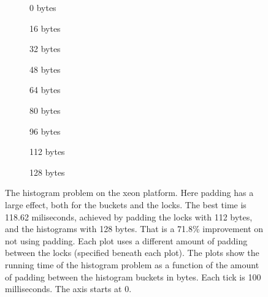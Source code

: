 \begin{figure}[hbpt]
	\graphicspath{{plots/}}
	\begin{subfigure}{0.32\textwidth}
		
		\caption{0 bytes}
	\end{subfigure}
	\begin{subfigure}{0.32\textwidth}
		
		\caption{16 bytes}
	\end{subfigure}
	\begin{subfigure}{0.32\textwidth}
		
		\caption{32 bytes}
	\end{subfigure}
	\begin{subfigure}{0.32\textwidth}
		
		\caption{48 bytes}
	\end{subfigure}
	\begin{subfigure}{0.32\textwidth}
		
		\caption{64 bytes}
	\end{subfigure}
	\begin{subfigure}{0.32\textwidth}
		
		\caption{80 bytes}
	\end{subfigure}
	\begin{subfigure}{0.32\textwidth}
		
		\caption{96 bytes}
	\end{subfigure}
	\begin{subfigure}{0.32\textwidth}
		
		\caption{112 bytes}
	\end{subfigure}
	\begin{subfigure}{0.32\textwidth}
		
		\caption{128 bytes}
	\end{subfigure}
	\caption{The histogram problem on the xeon platform. Here padding has a
	large effect, both for the buckets and the locks. The best time is
	118.62 miliseconds, achieved by padding the locks with 112 bytes, and
	the histograms with 128 bytes. That is a 71.8\% improvement on not using
	padding.
	Each plot uses a
	different amount of padding between the locks (specified beneath each
	plot). The plots show the running time of the histogram problem as a
	function of the amount of padding between the histogram buckets in
	bytes. Each tick is 100 milliseconds. The axis starts at 0.}
	\label{fig:histo-xeon}
\end{figure}
